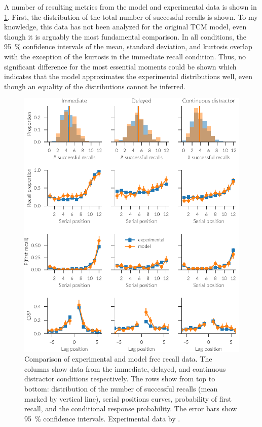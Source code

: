A number of resulting metrics from the model and experimental data is shown in \cref{fig:results-free}.
First, the distribution of the total number of successful recalls is shown.
To my knowledge, this data has not been analyzed for the original TCM model, even though it is arguably the most fundamental comparison.
In all conditions, the \SI{95}{\percent} confidence intervals of the mean, standard deviation, and kurtosis overlap with the exception of the kurtosis in the immediate recall condition.
Thus, no significant difference for the most essential moments could be shown which indicates that the model approximates the experimental distributions well, even though an equality of the distributions cannot be inferred.
\begin{figure}
    \centering
    \includegraphics{figures/results/free}
    \caption[Comparison of experimental and model free recall data]{Comparison of experimental and model free recall data. The columns show data from the immediate, delayed, and continuous distractor conditions respectively. The rows show from top to bottom: distribution of the number of successful recalls (mean marked by vertical line), serial positions curves, probability of first recall, and the conditional response probability. The error bars show \SI{95}{\percent} confidence intervals. Experimental data by \textcite{Howard1999}.}\label{fig:results-free}
\end{figure}

